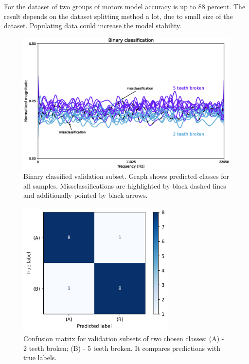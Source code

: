 \documentclass[energies,article,submit,pdftex,moreauthors]{Definitions/mdpi}
\begin{document}
For the dataset of two groups of motors model accuracy is up to 88 percent. The result depends on the dataset splitting method a lot, due to small size of the dataset. Populating data could increase the model stability. 

\begin{figure}[H]
\includegraphics[width=\textwidth]{images/binary_classification}
\caption{Binary classified validation subset. Graph shows predicted classes for all samples. Missclassifications are highlighted by black dashed lines and additionally pointed by black arrows.}
\end{figure}
\unskip
\vspace{5mm}

\begin{figure}[H]
\centering
\includegraphics[width=0.7\textwidth]{images/confusion_matrix}
\caption{Confusion matrix for validation subsets of two chosen classes: (A) - 2 teeth broken; (B) - 5 teeth broken. It compares predictions with true labels.}
\end{figure}
\unskip
\vspace{5mm}
\end{document}
